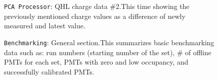 \documentclass[12pt]{article}
\begin{document}
\begin{figure}
\centering
\noindent{}
  \caption{\centering \texttt{PCA Processor}: QHL charge data \#2.\hspace{\textwidth}This time showing the previously mentioned charge values as a difference of newly measured and latest value.}
  \label{fig:pca6}
\end{figure}

\begin{figure}
\centering
\noindent{}
  \caption{\centering \texttt{Benchmarking}: General section.\hspace{\textwidth}This summarizes basic benchmarking data such as: run numbers (starting number of the set), \# of offline PMTs for each set, PMTs with zero and low occupancy, and successfully calibrated PMTs.}
  \label{fig:bench1}
\end{figure}
\end{document}

